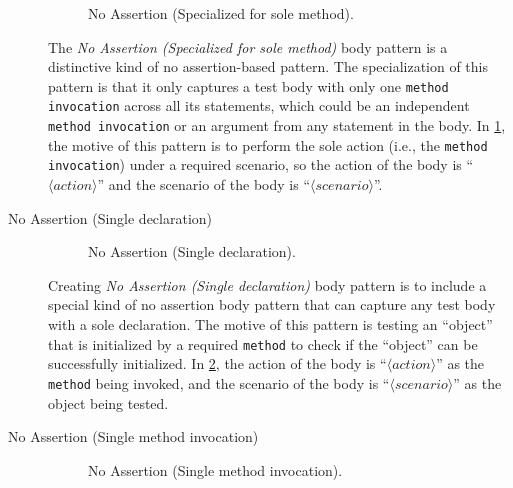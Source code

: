 \begin{description}
\begin{figure}[htbp]
\centering
    \begin{subfigure}{0.6\textwidth}
    \end{subfigure}
\caption{No Assertion (Specialized for sole method).}
\label{NoAstP_one}
\end{figure}

The \textit{No Assertion (Specialized for sole method)} body pattern is a distinctive kind of no assertion-based pattern.
%
The specialization of this pattern is that it only captures a test body with only one \texttt{method invocation} across all its statements, which could be an independent \texttt{method invocation} or an argument from any statement in the body.
%
In \cref{NoAstP_one}, the motive of this pattern is to perform the sole action (i.e., the \texttt{method invocation}) under a required scenario, so the action of the body is \enquote{$\langle action \rangle$} and the scenario of the body is \enquote{$\langle scenario \rangle$}.


\item[No Assertion (Single declaration)]

\begin{figure}[htbp]
\centering
    \begin{subfigure}{0.7\textwidth}
    \end{subfigure}
\caption{No Assertion (Single declaration).}
\label{NoAstP_SD}
\end{figure}

Creating \textit{No Assertion (Single declaration)} body pattern is to include a special kind of no assertion body pattern that can capture any test body with a sole declaration.
%
The motive of this pattern is testing an \enquote{object} that is initialized by a required \texttt{method} to check if the \enquote{object} can be successfully initialized.
%
In \cref{NoAstP_SD}, the action of the body is \enquote{$\langle action \rangle$} as the \texttt{method} being invoked, and the scenario of the body is \enquote{$\langle scenario \rangle$} as the object being tested.


\item[No Assertion (Single method invocation)]

\begin{figure}[htbp]
\centering
    \begin{subfigure}{0.45\textwidth}
    \end{subfigure}
\caption{No Assertion (Single method invocation).}
\label{NoAstP_MC}
\end{figure}


\end{description}
